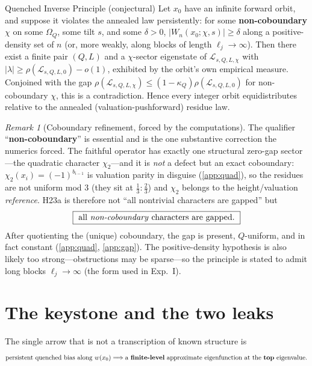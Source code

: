\documentclass[11pt]{article}
\newcommand{\Lcal}{\mathcal{L}}
\newcommand{\Om}{\Omega}
\theoremstyle{plain}
\theoremstyle{remark}
\newtheorem*{remark}{Remark}
\begin{document}
\begin{principlebox}{Quenched Inverse Principle (conjectural)}
Let $x_0$ have an infinite forward orbit, and suppose it violates the annealed law
persistently: for some \textbf{non-coboundary} $\chi$ on some $\Om_Q$, some tilt
$s$, and some $\delta>0$, $\lvert W_n(x_0;\chi,s)\rvert\ge\delta$ along a
positive-density set of $n$ (or, more weakly, along blocks of length
$\ell_j\to\infty$). Then there exist a finite pair $(Q,L)$ and a $\chi$-sector
eigenstate of $\Lcal_{s,Q,L,\chi}$ with
$\lvert\lambda\rvert\ge\rho(\Lcal_{s,Q,L,0})-o(1)$, exhibited by the orbit's own
empirical measure. Conjoined with the gap
$\rho(\Lcal_{s,Q,L,\chi})\le(1-\kappa_Q)\rho(\Lcal_{s,Q,L,0})$ for non-coboundary
$\chi$, this is a contradiction. Hence every integer orbit equidistributes
relative to the annealed (valuation-pushforward) residue law.
\end{principlebox}

\begin{remark}[Coboundary refinement, forced by the computations]
The qualifier ``\textbf{non-coboundary}'' is essential and is the one substantive
correction the numerics forced. The faithful operator has exactly one structural
zero-gap sector---the quadratic character $\chi_2$---and it is \emph{not} a defect
but an exact coboundary: $\chi_2(x_i)=(-1)^{b_{i-1}}$ is valuation parity in
disguise (\cref{app:quad}), so the residues are not uniform mod $3$ (they sit at
$\tfrac13:\tfrac23$) and $\chi_2$ belongs to the height/valuation \emph{reference}.
H23a is therefore not ``all nontrivial characters are gapped'' but
\[
\boxed{\ \text{all \emph{non-coboundary} characters are gapped.}\ }
\]
After quotienting the (unique) coboundary, the gap is present, $Q$-uniform, and in
fact constant (\cref{app:quad}, \cref{app:gap}). The positive-density hypothesis is
also likely too strong---obstructions may be sparse---so the principle is stated to
admit long blocks $\ell_j\to\infty$ (the form used in Exp.~I).
\end{remark}

\section{The keystone and the two leaks}

The single arrow that is not a transcription of known structure is
\[
\text{persistent quenched bias along }w(x_0)\Longrightarrow
\text{a \textbf{finite-level} approximate eigenfunction at the \textbf{top} eigenvalue.}
\]
\end{document}
